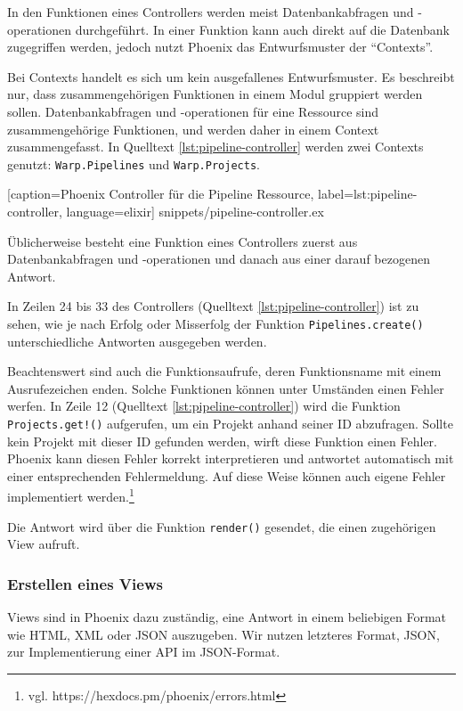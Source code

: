 In den Funktionen eines Controllers werden meist Datenbankabfragen und -operationen durchgeführt. In einer Funktion kann auch direkt auf die Datenbank zugegriffen werden, jedoch nutzt Phoenix das Entwurfsmuster der ``Contexts''.

Bei Contexts handelt es sich um kein ausgefallenes Entwurfsmuster. Es beschreibt nur, dass zusammengehörigen Funktionen in einem Modul gruppiert werden sollen. Datenbankabfragen und -operationen für eine Ressource sind zusammengehörige Funktionen, und werden daher in einem Context zusammengefasst. In Quelltext \ref{lst:pipeline-controller} werden zwei Contexts genutzt: \texttt{Warp.Pipelines} und \texttt{Warp.Projects}.


  [caption={Phoenix Controller für die Pipeline Ressource},
  label={lst:pipeline-controller},
  language=elixir]
  {snippets/pipeline-controller.ex}

Üblicherweise besteht eine Funktion eines Controllers zuerst aus Datenbankabfragen und -operationen und danach aus einer darauf bezogenen Antwort.

In Zeilen 24 bis 33 des Controllers (Quelltext \ref{lst:pipeline-controller}) ist zu sehen, wie je nach Erfolg oder Misserfolg der Funktion \texttt{Pipelines.create()} unterschiedliche Antworten ausgegeben werden.

Beachtenswert sind auch die Funktionsaufrufe, deren Funktionsname mit einem Ausrufezeichen enden. Solche Funktionen können unter Umständen einen Fehler werfen. In Zeile 12 (Quelltext \ref{lst:pipeline-controller}) wird die Funktion \texttt{Projects\allowbreak.get!()} aufgerufen, um ein Projekt anhand seiner ID abzufragen. Sollte kein Projekt mit dieser ID gefunden werden, wirft diese Funktion einen Fehler. Phoenix kann diesen Fehler korrekt interpretieren und antwortet automatisch mit einer entsprechenden Fehlermeldung. Auf diese Weise können auch eigene Fehler implementiert werden.\footnote{vgl. https://hexdocs.pm/phoenix/errors.html}

Die Antwort wird über die Funktion \texttt{render()} gesendet, die einen zugehörigen View aufruft.

\subsubsection{Erstellen eines Views}

Views sind in Phoenix dazu zuständig, eine Antwort in einem beliebigen Format wie HTML, XML oder JSON auszugeben. Wir nutzen letzteres Format, JSON, zur Implementierung einer API im JSON-Format.

